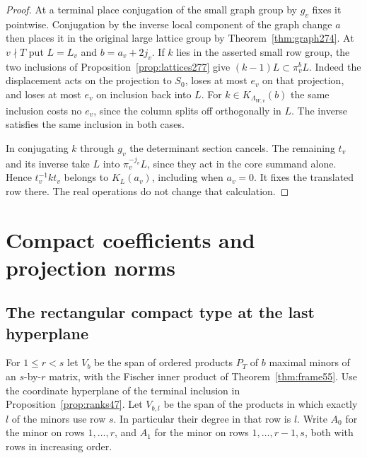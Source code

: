 \documentclass[a4paper,11pt]{article}
\theoremstyle{definition}
\theoremstyle{remark}
\numberwithin{equation}{section}
\begin{document}
\begin{proof}
At a terminal place conjugation of the small graph group by
\(g_v\) fixes it pointwise. Conjugation by the inverse local
component of the graph change \(a\) then places
it in the original large lattice group by
Theorem~\ref{thm:graph274}. At \(v\nmid T\) put \(L=L_v\)
and \(b=a_v+2j_v\). If \(k\) lies in the asserted small row
group, the two inclusions of Proposition~\ref{prop:lattices277}
give \((k-1)L\subset\pi_v^b L\). Indeed the displacement
acts on the projection to \(S_0\), loses at most \(e_v\) on
that projection, and loses at most \(e_v\) on inclusion back
into \(L\). For \(k\in K_{\Lambda_{W,v}}(b)\) the same
inclusion costs no \(e_v\), since the column splits off
orthogonally in \(L\). The inverse satisfies the same
inclusion in both cases.

In conjugating \(k\) through \(g_v\) the determinant section
cancels. The remaining \(t_v\) and its inverse take \(L\)
into \(\pi_v^{-j_v}L\), since they act in the core summand
alone. Hence \(t_v^{-1}kt_v\) belongs to \(K_L(a_v)\),
including when \(a_v=0\). It fixes the translated row there.
The real operations do not change that calculation.
\end{proof}

\section{Compact coefficients and projection norms}\label{nav:g-VIII-3}

\subsection{The rectangular compact type at the last hyperplane}\label{nav:V-30}
For \(1\le r<s\) let \(V_b\) be the span of ordered products
\(P_T\) of \(b\) maximal minors of an \(s\)-by-\(r\) matrix,
with the Fischer inner product of Theorem~\ref{thm:frame55}.
Use the coordinate hyperplane of the terminal inclusion
in Proposition~\ref{prop:ranks47}. Let \(V_{b,l}\) be the
span of the products in which exactly \(l\) of the minors
use row \(s\). In particular their degree in that row is \(l\).
Write \(A_0\) for the minor on rows \(1,\ldots,r\), and \(A_1\)
for the minor on rows \(1,\ldots,r-1,s\), both with rows in
increasing order.
\end{document}
